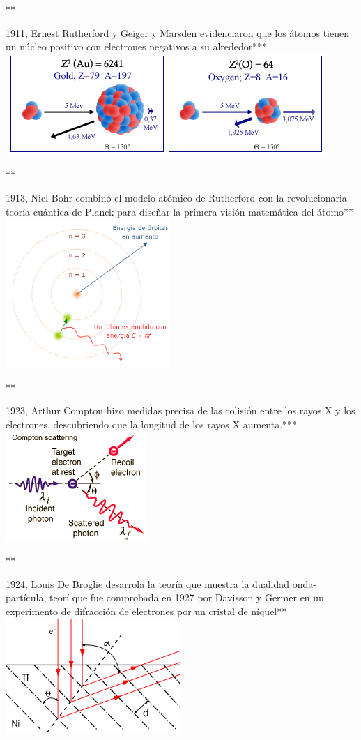 \documentclass[11pt]{article}
\begin{document}
**

1911, Ernest Rutherford y Geiger y Marsden evidenciaron que los átomos
tienen un núcleo positivo con electrones negativos a su
alrededor***\includegraphics{Rutherford_En.jpg}

**

1913, Niel Bohr combinó el modelo atómico de Rutherford con la
revolucionaria teoría cuántica de Planck para diseñar la primera visión
matemática del átomo** \includegraphics{at_bohr.png}

**

1923, Arthur Compton hizo medidas precisa de las colisión entre los
rayos X y los electrones, descubriendo que la longitud de los rayos X
aumenta.***\includegraphics{ef_compton.png}

**

1924, Louis De Broglie desarrola la teoría que muestra la dualidad
onda-partícula, teorí que fue comprobada en 1927 por Davisson y Germer
en un experimento de difracción de electrones por un cristal de
níquel**\includegraphics{Davisson_Germer.png}
\end{document}
